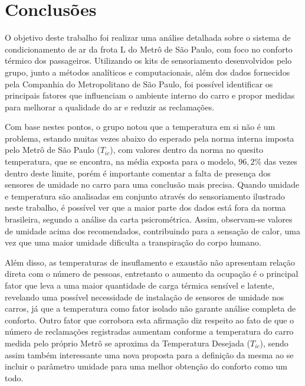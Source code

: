 \documentclass[acronym,symbols,table]{fei}
\begin{document}
\chapter{Conclusões}

O objetivo deste trabalho foi realizar uma análise detalhada sobre o sistema de condicionamento de ar da frota L do Metrô de São Paulo, com foco no conforto térmico dos passageiros. Utilizando os kits de sensoriamento desenvolvidos pelo grupo, junto a métodos analíticos e computacionais, além dos dados fornecidos pela Companhia do Metropolitano de São Paulo, foi possível identificar os principais fatores que influenciam o ambiente interno do carro e propor medidas para melhorar a qualidade do ar e reduzir as reclamações.

Com base nestes pontos, o grupo notou que a temperatura em si não é um problema, estando muitas vezes abaixo do esperado pela norma interna imposta pelo Metrô de São Paulo (${T}_{ic}$), com valores dentro da norma \textcite{abnt216401} no quesito temperatura, que se encontra, na média exposta para o modelo, $96,2\%$ das vezes dentro deste limite, porém é importante comentar a falta de presença dos sensores de umidade no carro para uma conclusão mais precisa. Quando umidade e temperatura são analisadas em conjunto através do sensoriamento ilustrado neste trabalho, é possível ver que a maior parte dos dados está fora da norma brasileira, segundo a análise da carta psicrométrica. Assim, observam-se valores de umidade acima dos recomendados, contribuindo para a sensação de calor, uma vez que uma maior umidade dificulta a transpiração do corpo humano.

Além disso, as temperaturas de insuflamento e exaustão não apresentam relação direta com o número de pessoas, entretanto o aumento da ocupação é o principal fator que leva a uma maior quantidade de carga térmica sensível e latente, revelando uma possível necessidade de instalação de sensores de umidade nos carros, já que a temperatura como fator isolado não garante análise completa de conforto. Outro fator que corrobora esta afirmação diz respeito ao fato de que o número de  reclamações registradas aumentam conforme a temperatura do carro medida pelo próprio Metrô se aproxima da Temperatura Desejada (${T}_{ic}$), sendo assim também interessante uma nova proposta para a definição da mesma ao se incluir o parâmetro umidade para uma melhor obtenção do conforto como um todo.
\end{document}
